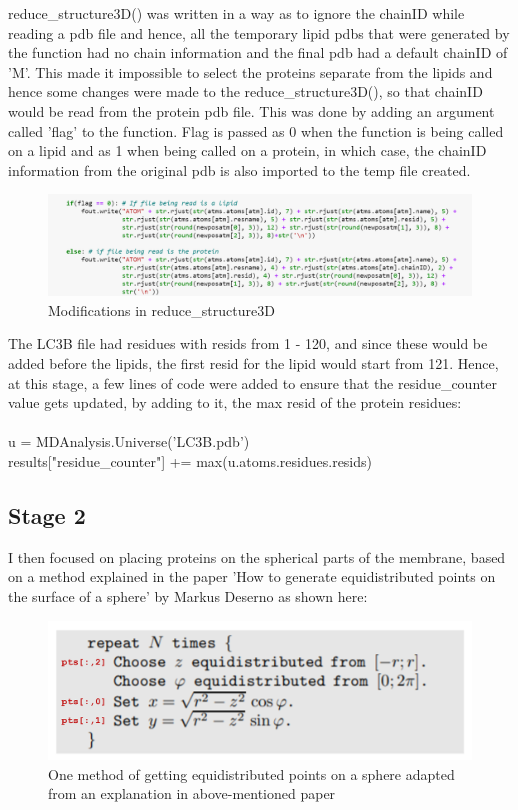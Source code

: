\documentclass[12pt, a4paper]{report}
\begin{document}
reduce\_structure3D() was written in a way as to ignore the chainID while reading a pdb file and hence, all the temporary lipid pdbs that were generated by the function had no chain information and the final pdb had a default chainID of 'M'. This made it impossible to select the proteins separate from the lipids and hence some changes were made to the reduce\_structure3D(), so that chainID would be read from the protein pdb file. This was done by adding an argument called 'flag' to the function. Flag is passed as 0 when the function is being called on a lipid and as 1 when being called on a protein, in which case, the chainID information from the original pdb is also imported to the temp file created.

\begin{figure}[h]
    \centering
    \includegraphics[scale=0.45]{images/reduce.png} 
    \centering 
    \caption{Modifications in reduce\_structure3D} 
\end{figure} 

The LC3B file had residues with resids from 1 - 120, and since these would be added before the lipids, the first resid for the lipid would start from 121. Hence, at this stage, a few lines of code were added to ensure that the residue\_counter value gets updated, by adding to it, the max resid of the protein residues:
\\~\\
u = MDAnalysis.Universe('LC3B.pdb') 
\\ 
results["residue\_counter"] += max(u.atoms.residues.resids)



\subsection*{Stage 2} 

I then focused on placing proteins on the spherical parts of the membrane, based on a method explained in the paper 'How to generate equidistributed points on the surface of a sphere' by Markus Deserno as shown here: 
\begin{figure}[h]
    \includegraphics[scale=0.76]{images/deserno.png} 
    \centering 
    \caption{One method of getting equidistributed points on a  sphere adapted from an explanation in above-mentioned paper}
    \centering
\end{figure} 
\end{document}
